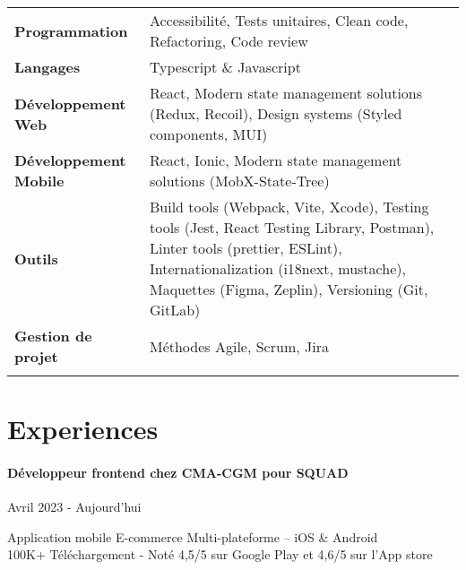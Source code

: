 \documentclass{article}
\begin{document}
\begin{tabularx}{\textwidth}{@{}lX@{}}

  \textbf{Programmation} & Accessibilité, Tests unitaires, Clean code, Refactoring, Code review \\
  \addlinespace[5pt] %

  \textbf{Langages} & Typescript \& Javascript \\
  \addlinespace[5pt] %

  \textbf{Développement Web} & React, Modern state management solutions (Redux, Recoil), Design systems (Styled components, MUI) \\
  \addlinespace[5pt] %

  \textbf{Développement Mobile} & React, Ionic, Modern state management solutions (MobX-State-Tree) \\
  \addlinespace[5pt] %

  \textbf{Outils} & Build tools (Webpack, Vite, Xcode), Testing tools (Jest, React Testing Library, Postman), Linter tools (prettier, ESLint), Internationalization (i18next, mustache), Maquettes (Figma, Zeplin), Versioning (Git, GitLab) \\
  \addlinespace[5pt] %

  \textbf{Gestion de projet} & Méthodes Agile, Scrum,  Jira \\
  \addlinespace[5pt] %
  
\end{tabularx}

\vspace{4ex}
\hrulefill
\section*{Experiences}

\paragraph{Développeur frontend chez CMA-CGM pour SQUAD}\hspace*{\fill}Avril 2023 - Aujourd'hui

\noindent
Application mobile E-commerce Multi-plateforme – iOS \& Android \\
100K+ Téléchargement - Noté 4,5/5 sur Google Play et 4,6/5 sur l'App store
\end{document}
